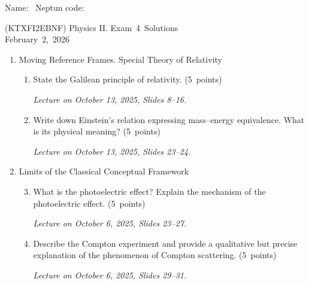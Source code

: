 \documentclass[a4paper,12pt]{letter}
\begin{document}
Name: \hrulefill\ Neptun code: \hrulefill

\bigskip

\begin{center}
(KTXFI2EBNF) Physics II. Exam~4~Solutions\\
February~2,~2026
\end{center}

\bigskip
 
\begin{enumerate}[label=\Roman*.]
   
\item Moving Reference Frames. Special Theory of Relativity

\begin{enumerate}[label=\arabic*.]
\setcounter{enumii}{0} %

\item State the Galilean principle of relativity. \hfill (5~points)

\smallskip
\textit{Lecture on October 13, 2025, Slides 8--16.}

\item Write down Einstein’s relation expressing mass–energy equivalence. What is its physical meaning? \hfill (5~points)

\smallskip
\textit{Lecture on October 13, 2025, Slides 23--24.}

\end{enumerate}


\item Limits of the Classical Conceptual Framework

\begin{enumerate}[label=\arabic*.]
\setcounter{enumii}{2} %

\item What is the photoelectric effect? Explain the mechanism of the photoelectric effect. \hfill (5~points)

\smallskip
\textit{Lecture on October 6, 2025, Slides 23--27.}
    
\item Describe the Compton experiment and provide a qualitative but precise explanation of the phenomenon of Compton scattering. \hfill (5~points)

\smallskip
\textit{Lecture on October 6, 2025, Slides 29--31.}
  

\end{enumerate}
\end{enumerate}
\end{document}
